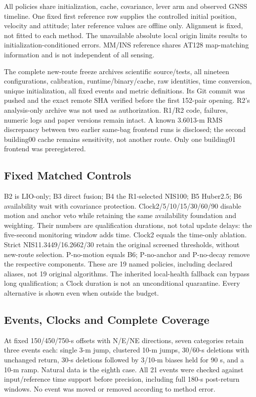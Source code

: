 \documentclass[conference]{IEEEtran}
\begin{document}
All policies share initialization, cache, covariance, lever arm and observed GNSS timeline. One fixed first reference row supplies the controlled initial position, velocity and attitude; later reference values are offline only. Alignment is fixed, not fitted to each method. The unavailable absolute local origin limits results to initialization-conditioned errors. MM/INS reference shares AT128 map-matching information and is not independent of all sensing.

The complete new-route freeze archives scientific source/tests, all nineteen configurations, calibration, runtime/binary/cache, raw identities, time conversion, unique initialization, all fixed events and metric definitions. Its Git commit was pushed and the exact remote SHA verified before the first 152-pair opening. R2's analysis-only archive was not used as authorization. R1/R2 code, failures, numeric logs and paper versions remain intact. A known 3.6013-m RMS discrepancy between two earlier same-bag frontend runs is disclosed; the second building00 cache remains sensitivity, not another route. Only one building01 frontend was preregistered.

\subsection{Fixed Matched Controls}
B2 is LIO-only; B3 direct fusion; B4 the R1-selected NIS100; B5 Huber2.5; B6 availability wait with covariance protection. Clock2/5/10/15/30/60/90 disable motion and anchor veto while retaining the same availability foundation and weighting. Their numbers are qualification durations, not total update delays: the five-second monitoring window adds time. Clock2 equals the time-only ablation. Strict NIS11.3449/16.2662/30 retain the original screened thresholds, without new-route selection. P-no-motion equals B6; P-no-anchor and P-no-decay remove the respective components. These are 19 named policies, including declared aliases, not 19 original algorithms. The inherited local-health fallback can bypass long qualification; a Clock duration is not an unconditional quarantine. Every alternative is shown even when outside the budget.

\subsection{Events, Clocks and Complete Coverage}
At fixed 150/450/750-s offsets with N/E/NE directions, seven categories retain three events each: single 3-m jump, clustered 10-m jumps, 30/60-s deletions with unchanged return, 30-s deletions followed by 3/10-m biases held for 90 s, and a 10-m ramp. Natural data is the eighth case. All 21 events were checked against input/reference time support before precision, including full 180-s post-return windows. No event was moved or removed according to method error.
\end{document}

